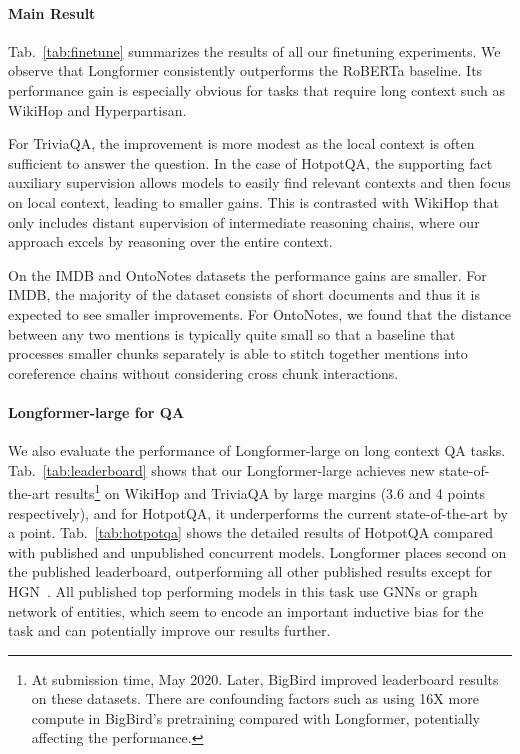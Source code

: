 \paragraph{Main Result}
Tab.~\ref{tab:finetune} summarizes the results of all our finetuning experiments. We observe that Longformer consistently outperforms the RoBERTa baseline. Its performance gain is especially obvious for tasks that require long context such as WikiHop and Hyperpartisan.

For TriviaQA, the improvement is more modest as the local context is often sufficient to answer the question. In the case of HotpotQA, the supporting fact auxiliary supervision allows models to easily find relevant contexts and then focus on local context, leading to smaller gains.  This is contrasted with WikiHop that only includes distant supervision of intermediate reasoning chains, where our approach excels by reasoning over the entire context.

On the IMDB and OntoNotes datasets the performance gains are smaller. For IMDB, the majority of the dataset consists of short documents and thus it is expected to see smaller improvements. For OntoNotes, we found that the distance between any two mentions is typically quite small so that a baseline that processes smaller chunks separately is able to stitch together mentions into coreference chains without considering cross chunk interactions.

\paragraph{Longformer-large for QA} We also evaluate the performance of Longformer-large on long context QA tasks. Tab.~\ref{tab:leaderboard}
shows that our Longformer-large achieves new state-of-the-art
results\footnote{At submission time, May 2020. Later, BigBird \cite{Zaheer2020BigBT} improved leaderboard results on these datasets. There are confounding factors such as using 16X more compute in BigBird's pretraining compared with Longformer, potentially affecting the performance.} on WikiHop and TriviaQA by large margins (3.6 and 4 points respectively), and for HotpotQA, it underperforms the current state-of-the-art \cite{hotpotqasota} by a point.
Tab.~\ref{tab:hotpotqa} shows the detailed results of HotpotQA compared with published and unpublished concurrent models. Longformer places second on the published leaderboard, outperforming all other published results except for HGN~\cite{hotpotqasota}. All published top performing models in this task \cite{Tu2019SelectAA,hotpotqasota,Shao2020IsGS} use GNNs \cite{kipf2017semi} or graph network of entities, which seem to encode an important inductive bias for the task and can potentially improve our results further. 

